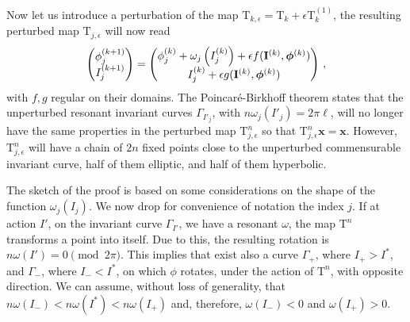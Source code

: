 Now let us introduce a perturbation of the map $\mathrm{T}_{k,\epsilon} = \mathrm{T}_k + \epsilon \mathrm{T}^{(1)}_k$, the resulting perturbed map $\mathrm{T}_{j,\epsilon}$ will now read
\begingroup
\renewcommand*{\arraystretch}{1.5}
\begin{equation}
	\begin{pmatrix} \phi^{(k+1)}_j \\ I^{(k+1)}_j \end{pmatrix}  = \begin{pmatrix} \phi^{(k)}_j + \omega_j\left(I_j^{(k)}\right) + \epsilon f(\vb{I}^{(k)}, \boldsymbol{\phi}^{(k)}) \\ I_j^{(k)}  + \epsilon g(\vb{I}^{(k)}, \boldsymbol{\phi}^{(k)}) \end{pmatrix} \, ,
    \label{eq:area_perturbed_map}
\end{equation}
\endgroup
with $f, g$ regular on their domains. The Poincaré-Birkhoff theorem states that the unperturbed resonant invariant curves $\Gamma_{I'_j}$, with $n\omega_j(I'_j)=2\pi \ell$, will no longer have the same properties in the perturbed map $\mathrm{T}_{j,\epsilon}^n$ so that $\mathrm{T}_{j,\epsilon}^n \mathbf{x} = \mathbf{x}$. However, $\mathrm{T}^n_{j,\epsilon}$ will have a chain of $2n$ fixed points close to the unperturbed commensurable invariant curve, half of them elliptic, and half of them hyperbolic.

The sketch of the proof is based on some considerations on the shape of the function $\omega_j(I_j)$. We now drop for convenience of notation the index $j$.  If at action $I'$, on the invariant curve $\Gamma_{I'}$, we have a resonant $\omega$, the map $\mathrm{T}^n$ transforms a point into itself. Due to this, the resulting rotation is $n\omega(I')=0 \pmod{2\pi}$. This implies that exist also a curve $\Gamma_+$, where $I_+>I^*$, and $\Gamma_-$, where $I_-<I^*$, on which $\phi$ rotates, under the action of $\mathrm{T}^n$, with opposite direction. We can assume, without loss of generality, that $n\omega(I_-)<n\omega(I^*)<n\omega(I_+)$ and, therefore, $\omega(I_-)<0$ and $\omega(I_+)>0$.

